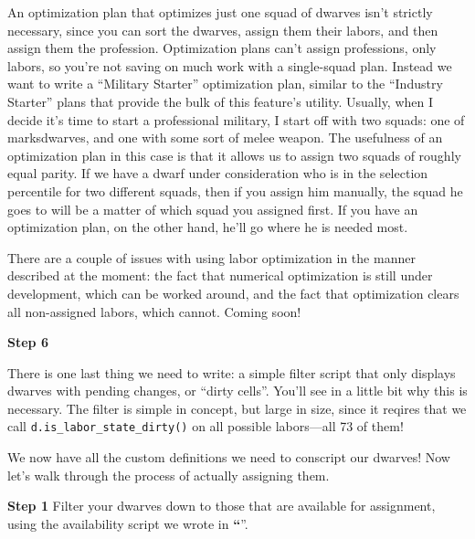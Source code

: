 \documentclass[]{article}
\newcommand{\jump}[1] {\textbf{``\nameref{sec:#1}}''}
\newcommand{\legacy}[1] {
\begin{center}
\colorbox{legacy-content}{
\begin{minipage}[t]{0.95\linewidth}
#1
\end{minipage}
}
\end{center}
}
\newcommand{\step}[1] {
\vspace{12pt}
\noindent \textbf{Step #1}
}
\begin{document}
An optimization plan that optimizes just one squad of dwarves isn't strictly necessary, since you can
sort the dwarves, assign them their labors, and then assign them the profession. Optimization plans can't
assign professions, only labors, so you're not saving on much work with a single-squad plan. Instead we
want to write a ``Military Starter'' optimization plan, similar to the ``Industry Starter'' plans that
provide the bulk of this feature's utility. Usually, when I decide it's time to start a professional
military, I start off with two squads: one of marksdwarves, and one with some sort of melee weapon.
The usefulness of an optimization plan in this case is that it allows us to assign two squads of roughly
equal parity. If we have a dwarf under consideration who is in the selection percentile for two
different squads, then if you assign him manually, the squad he goes to will be a matter of which squad
you assigned first. If you have an optimization plan, on the other hand, he'll go where he is needed
most.

\legacy{There are a couple of issues with using labor optimization in the manner described at
the moment: the fact that numerical optimization is still under development, which can be worked around,
and the fact that optimization clears all non-assigned labors, which cannot. Coming soon!}

\step{6}
There is one last thing we need to write: a simple filter script that only displays dwarves with
pending changes, or ``dirty cells''. You'll see in a little bit why this is necessary. The filter is
simple in concept, but large in size, since it reqires that we call \texttt{d.is\_labor\_state\_dirty()}
on all possible labors---all 73 of them!


We now have all the custom definitions we need to conscript our dwarves! Now let's walk through the
process of actually assigning them.

\step{1} Filter your dwarves down to those that are available for assignment, using the availability
script we wrote in \jump{Writing Complex Scripts}.
\end{document}
